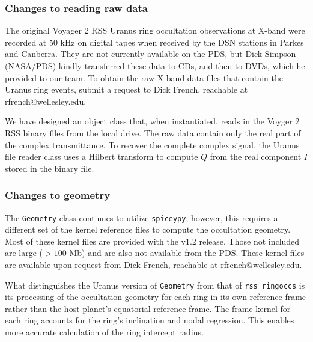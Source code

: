 \documentclass[titlepage, 12pt]{article}
\begin{document}
            \subsubsection{Changes to reading raw data}
            The original Voyager 2 RSS Uranus ring occultation observations at X-band were recorded at 50 kHz on digital tapes when received by the 
            DSN stations in Parkes and Canberra. They are not currently available on the PDS, but Dick Simpson (NASA/PDS) kindly transferred these data to CDs, and then to 
            DVDs, which he provided to our team. To obtain the raw X-band data files that contain the Uranus ring events, submit a request to Dick French, reachable at rfrench@wellesley.edu.
            \par\hfill\par
            We have designed an object class that, when 
            instantiated, reads in the Voyger 2 RSS binary files from the local drive. 
            The raw data contain only the real part of the complex transmittance. 
            To recover the complete complex signal, the 
            Uranus file reader class uses a Hilbert transform to compute $Q$ from the real component 
            $I$ stored in the binary file.
           \subsubsection{Changes to geometry}
           The \texttt{Geometry} class continues to utilize \texttt{spiceypy}; however, this requires 
           a different set of the kernel reference files to compute the occultation geometry. Most of 
           these kernel files are provided with the v1.2 release. Those not included are large 
           ($>100$ Mb) and are also not available from the PDS. These kernel files are available upon 
           request from Dick French, reachable at rfrench@wellesley.edu. 
           \par\hfill\par
           What distinguishes the Uranus version
           of \texttt{Geometry} from that of \texttt{rss\_ringoccs} is its processing of the
           occultation geometry for each ring in its own reference frame rather than the
           host planet's equatorial reference frame. The frame kernel for each ring accounts for the ring's inclination and nodal regression. This enables more accurate calculation of the ring
           intercept radius.
\end{document}
